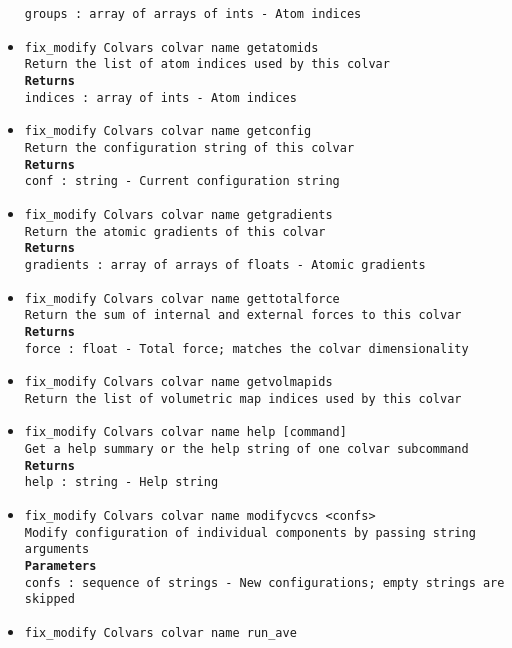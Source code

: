 \begin{itemize}
\texttt{groups : array of arrays of ints - Atom indices}
\item \texttt{fix\_modify Colvars colvar name getatomids}
\\
\texttt{Return the list of atom indices used by this colvar}
\\
\texttt{\textbf{Returns}}
\\
\texttt{indices : array of ints - Atom indices}
\item \texttt{fix\_modify Colvars colvar name getconfig}
\\
\texttt{Return the configuration string of this colvar}
\\
\texttt{\textbf{Returns}}
\\
\texttt{conf : string - Current configuration string}
\item \texttt{fix\_modify Colvars colvar name getgradients}
\\
\texttt{Return the atomic gradients of this colvar}
\\
\texttt{\textbf{Returns}}
\\
\texttt{gradients : array of arrays of floats - Atomic gradients}
\item \texttt{fix\_modify Colvars colvar name gettotalforce}
\\
\texttt{Return the sum of internal and external forces to this colvar}
\\
\texttt{\textbf{Returns}}
\\
\texttt{force : float - Total force; matches the colvar dimensionality}
\item \texttt{fix\_modify Colvars colvar name getvolmapids}
\\
\texttt{Return the list of volumetric map indices used by this colvar}
\item \texttt{fix\_modify Colvars colvar name help [command]}
\\
\texttt{Get a help summary or the help string of one colvar subcommand}
\\
\texttt{\textbf{Returns}}
\\
\texttt{help : string - Help string}
\item \texttt{fix\_modify Colvars colvar name modifycvcs <confs>}
\\
\texttt{Modify configuration of individual components by passing string arguments}
\\
\texttt{\textbf{Parameters}}
\\
\texttt{confs : sequence of strings - New configurations; empty strings are skipped}
\item \texttt{fix\_modify Colvars colvar name run\_ave}

\end{itemize}
